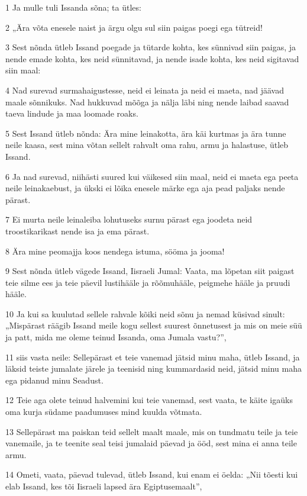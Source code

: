 \par 1 Ja mulle tuli Issanda sõna; ta ütles:
\par 2 „Ära võta enesele naist ja ärgu olgu sul siin paigas poegi ega tütreid!
\par 3 Sest nõnda ütleb Issand poegade ja tütarde kohta, kes sünnivad siin paigas, ja nende emade kohta, kes neid sünnitavad, ja nende isade kohta, kes neid sigitavad siin maal:
\par 4 Nad surevad surmahaigustesse, neid ei leinata ja neid ei maeta, nad jäävad maale sõnnikuks. Nad hukkuvad mõõga ja nälja läbi ning nende laibad saavad taeva lindude ja maa loomade roaks.
\par 5 Sest Issand ütleb nõnda: Ära mine leinakotta, ära käi kurtmas ja ära tunne neile kaasa, sest mina võtan sellelt rahvalt oma rahu, armu ja halastuse, ütleb Issand.
\par 6 Ja nad surevad, niihästi suured kui väikesed siin maal, neid ei maeta ega peeta neile leinakaebust, ja ükski ei lõika enesele märke ega aja pead paljaks nende pärast.
\par 7 Ei murta neile leinaleiba lohutuseks surnu pärast ega joodeta neid troostikarikast nende isa ja ema pärast.
\par 8 Ära mine peomajja koos nendega istuma, sööma ja jooma!
\par 9 Sest nõnda ütleb vägede Issand, Iisraeli Jumal: Vaata, ma lõpetan siit paigast teie silme ees ja teie päevil lustihääle ja rõõmuhääle, peigmehe hääle ja pruudi hääle.
\par 10 Ja kui sa kuulutad sellele rahvale kõiki neid sõnu ja nemad küsivad sinult: „Mispärast räägib Issand meile kogu sellest suurest õnnetusest ja mis on meie süü ja patt, mida me oleme teinud Issanda, oma Jumala vastu?”,
\par 11 siis vasta neile: Sellepärast et teie vanemad jätsid minu maha, ütleb Issand, ja läksid teiste jumalate järele ja teenisid ning kummardasid neid, jätsid minu maha ega pidanud minu Seadust.
\par 12 Teie aga olete teinud halvemini kui teie vanemad, sest vaata, te käite igaüks oma kurja südame paadumuses mind kuulda võtmata.
\par 13 Sellepärast ma paiskan teid sellelt maalt maale, mis on tundmatu teile ja teie vanemaile, ja te teenite seal teisi jumalaid päevad ja ööd, sest mina ei anna teile armu.
\par 14 Ometi, vaata, päevad tulevad, ütleb Issand, kui enam ei öelda: „Nii tõesti kui elab Issand, kes tõi Iisraeli lapsed ära Egiptusemaalt”,
